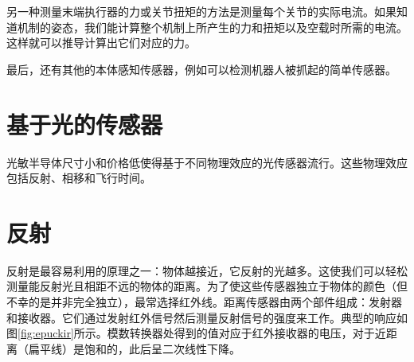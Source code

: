 另一种测量末端执行器的力或关节扭矩的方法是测量每个关节的实际电流。如果知道机制的姿态，我们能计算整个机制上所产生的力和扭矩以及空载时所需的电流。这样就可以推导计算出它们对应的力。


最后，还有其他的本体感知传感器，例如可以检测机器人被抓起的简单传感器。



\section{基于光的传感器}
光敏半导体尺寸小和价格低使得基于不同物理效应的光传感器流行。这些物理效应包括反射、相移和飞行时间。


\section{反射}

反射是最容易利用的原理之一：物体越接近，它反射的光越多。这使我们可以轻松测量能反射光且相距不远的物体的距离。为了使这些传感器独立于物体的颜色（但不幸的是并非完全独立），最常选择红外线。距离传感器由两个部件组成：发射器和接收器。它们通过发射红外信号然后测量反射信号的强度来工作。典型的响应如图\ref{fig:epuckir}所示。模数转换器处得到的值对应于红外接收器的电压，对于近距离（扁平线）是饱和的，此后呈二次线性下降。

